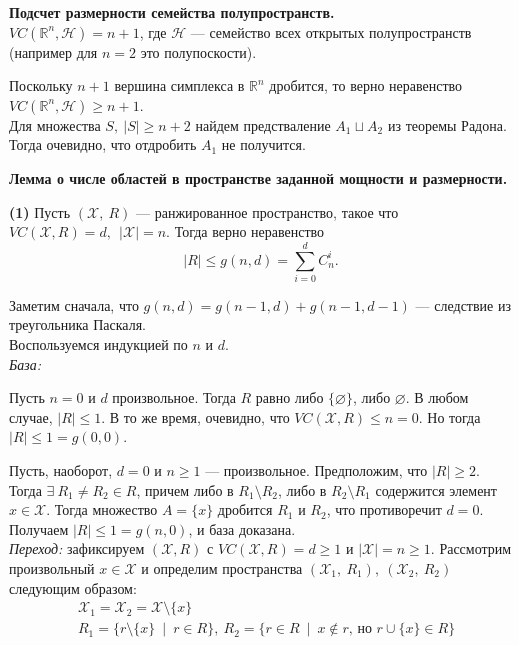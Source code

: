 \textbf{Подсчет размерности семейства полупространств.}\\

\Statement $VC(\mathbb{R}^n, \mathcal{H}) = n + 1$, где $\mathcal{H}$ --- семейство всех открытых полупространств (например для $n=2$ это полупоскости).

\Proof Поскольку $n+1$ вершина симплекса в $\mathbb{R}^n$ дробится, то верно неравенство $VC(\mathbb{R}^n, \mathcal{H}) \ge n+1$. \\ Для множества $S,\: |S| \ge n+2$ найдем предстваление $A_1 \sqcup A_2$ из теоремы Радона. Тогда очевидно, что отдробить $A_1$ не получится.

\EndProof

\textbf{Лемма о числе областей в пространстве заданной мощности и размерности.}

\Lemma \textbf{(1)} Пусть $(\mathcal{X},\: R)$ --- ранжированное пространство, такое что $VC(\mathcal{X}, R) = d,\:\: |\mathcal{X}| = n$. Тогда верно неравенство $$ |R| \le g(n, d) = \sum\limits_{i=0}^{d} C_n^i.$$

\Proof Заметим сначала, что $g(n, d) = g(n-1, d) + g(n-1, d-1)$ --- следствие из треугольника Паскаля.\\
Воспользуемся индукцией по $n$ и $d$. \\

\textit{База:} 

Пусть $n=0$ и $d$ произвольное. Тогда $R$ равно либо $\{ \varnothing\}$, либо $\varnothing$. В любом случае, $|R| \le 1$. В то же время, очевидно, что $VC(\mathcal{X}, R) \le n = 0$. Но тогда $|R| \le 1 = g(0, 0)$. 

Пусть, наоборот, $d=0$ и $n \ge 1$ --- произвольное. Предположим, что $|R| \ge 2$. Тогда $\exists \: R_1 \neq R_2 \in R$, причем либо в $R_1 \setminus R_2$, либо в $R_2 \setminus R_1$ содержится элемент $x \in \mathcal{X}$. Тогда множество $A = \{ x\}$ дробится $R_1$ и $R_2$, что противоречит $d=0$. Получаем $|R| \le 1 = g(n, 0)$, и база доказана. \\

\textit{Переход:} зафиксируем $(\mathcal{X}, R)$ с $VC(\mathcal{X},R) = d \ge 1$ и $|\mathcal{X}| = n \ge 1$. Рассмотрим произвольный $x \in \mathcal{X}$ и определим пространства $(\mathcal{X}_1,\: R_1),\: (\mathcal{X}_2,\: R_2)$ следующим образом:
\begin{align*}
    & \mathcal{X}_1 = \mathcal{X}_2 = \mathcal{X} \setminus \{ x\}\\
    & R_1 = \{r \setminus \{ x\}\: \mid\: r \in R\},\: R_2 = \{r \in R\: \mid\: x\not\in r\text{, но } r\cup\{x\} \in R\}
\end{align*}

